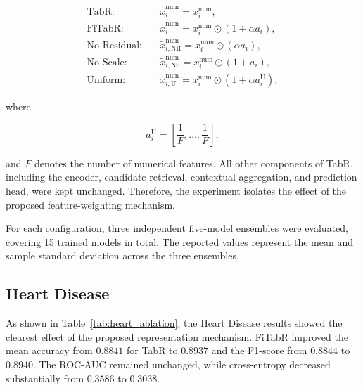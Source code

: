 \documentclass[11pt,a4paper,oneside, openany, reqno, chapter, nokorean]{oblivoir}
\theoremstyle{definition}
\theoremstyle{remark}
\numberwithin{equation}{chapter}
\theoremstyle{definition}
\theoremstyle{remark}
\theoremstyle{definition}
\begin{document}
\begin{equation}
\begin{aligned}
\text{TabR:}\quad
&
\tilde{x}_{i}^{\mathrm{num}}
=
x_i^{\mathrm{num}},
\\[3pt]
\text{FiTabR:}\quad
&
\tilde{x}_{i}^{\mathrm{num}}
=
x_i^{\mathrm{num}}
\odot
\left(1+\alpha a_i\right),
\\[3pt]
\text{No Residual:}\quad
&
\tilde{x}_{i,\mathrm{NR}}^{\mathrm{num}}
=
x_i^{\mathrm{num}}
\odot
\left(\alpha a_i\right),
\\[3pt]
\text{No Scale:}\quad
&
\tilde{x}_{i,\mathrm{NS}}^{\mathrm{num}}
=
x_i^{\mathrm{num}}
\odot
\left(1+a_i\right),
\\[3pt]
\text{Uniform:}\quad
&
\tilde{x}_{i,\mathrm{U}}^{\mathrm{num}}
=
x_i^{\mathrm{num}}
\odot
\left(1+\alpha a_i^{\mathrm{U}}\right),
\end{aligned}
\label{eq:ablation_variants}
\end{equation}

where

\begin{equation}
a_i^{\mathrm{U}}
=
\left[
\frac{1}{F},
\ldots,
\frac{1}{F}
\right],
\label{eq:ablation_uniform}
\end{equation}

and $F$ denotes the number of numerical features. All other components
of TabR, including the encoder, candidate retrieval, contextual
aggregation, and prediction head, were kept unchanged. Therefore, the
experiment isolates the effect of the proposed feature-weighting
mechanism.

For each configuration, three independent five-model ensembles were evaluated,
covering 15 trained models in total. The reported values
represent the mean and sample standard deviation across the three
ensembles.

\subsection{Heart Disease}
\label{subsec:heart_ablation}

As shown in Table~\ref{tab:heart_ablation}, the Heart Disease results
showed the clearest effect of the proposed
representation mechanism. FiTabR improved the mean accuracy from
$0.8841$ for TabR to $0.8937$ and the F1-score from $0.8844$ to
$0.8940$. The ROC-AUC remained unchanged, while
cross-entropy decreased substantially from $0.3586$ to $0.3038$.
\end{document}
